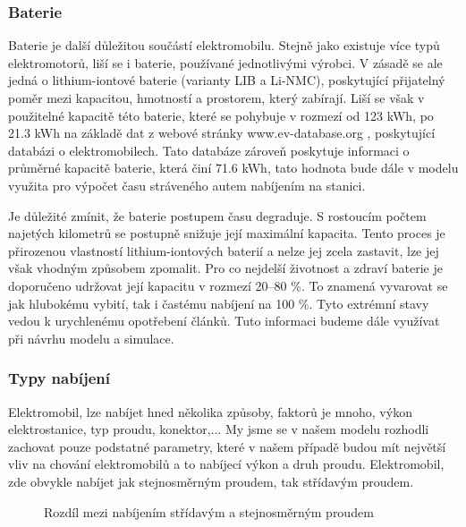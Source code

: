\documentclass[a4paper,11pt]{article}
\begin{document}
\subsubsection{Baterie}

\label{batteries}
Baterie je další důležitou součástí elektromobilu. Stejně jako existuje více typů elektromotorů, 
liší se i baterie, používané jednotlivými výrobci. V zásadě se ale jedná o lithium-iontové baterie
(varianty LIB a Li-NMC), poskytující přijatelný poměr mezi kapacitou, hmotností a prostorem, který 
zabírají.\cite{baterie_ev_wiki} Liší se však v použitelné kapacitě této baterie, které se pohybuje 
v rozmezí od 123 kWh, po 21.3 kWh na základě dat z webové stránky www.ev-database.org \cite{ev_database}, 
poskytující databázi o elektromobilech. Tato databáze zároveň poskytuje informaci o průměrné kapacitě
baterie, která činí 71.6 kWh, tato hodnota bude dále v modelu využita pro výpočet času stráveného autem
nabíjením na stanici.

Je důležité zmínit, že baterie postupem času degraduje. S rostoucím počtem najetých kilometrů se postupně snižuje její maximální kapacita. Tento proces je přirozenou vlastností lithium-iontových baterií a nelze jej zcela zastavit, lze jej však vhodným způsobem zpomalit. Pro co nejdelší životnost a zdraví baterie je doporučeno udržovat její kapacitu v rozmezí 20–80 \%. To znamená vyvarovat se jak hlubokému vybití, tak i častému nabíjení na 100 \%. Tyto extrémní stavy vedou k urychlenému opotřebení článků. Tuto informaci budeme dále využívat při návrhu modelu a simulace.\cite{battery-health}

\subsubsection{Typy nabíjení}
Elektromobil, lze nabíjet hned několika způsoby, faktorů je mnoho, výkon elektrostanice, typ proudu, 
konektor,... My jsme se v našem modelu rozhodli zachovat pouze podstatné parametry, které v našem 
případě budou mít největší vliv na chování elektromobilů a to nabíjecí výkon a druh proudu. 
Elektromobil, zde obvykle nabíjet jak stejnosměrným proudem, tak střídavým proudem.

\begin{figure}[H]
    \centering
    \caption{Rozdíl mezi nabíjením střídavým a stejnosměrným proudem \cite{rozdil_mezi_ac_dc_nabijenim}}
    \label{figure:difference-between-ac-and-cd-charging-ev}
\end{figure}
\end{document}
